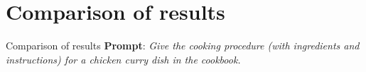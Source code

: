 \documentclass[10pt, t]{beamer}
\begin{document}
    \section{Comparison of results}
    \begin{frame}{Comparison of results}
        \textbf{Prompt}: \textit{Give the cooking procedure (with ingredients and instructions) for a chicken curry dish in the cookbook.}
        \begin{figure}
        \end{figure}
    \end{frame}
\end{document}
